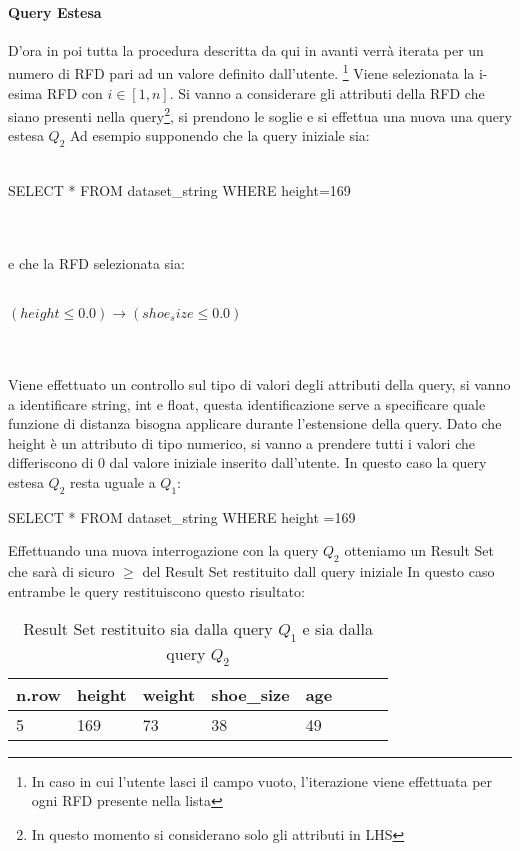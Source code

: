 \paragraph{Query Estesa}
D'ora in poi tutta la procedura descritta da qui in avanti verrà iterata per un numero di RFD pari ad un valore definito dall'utente. \footnote{In caso in cui l'utente lasci il campo vuoto, l'iterazione viene effettuata per ogni RFD presente nella lista}
Viene selezionata la i-esima RFD con $i\in[1,n]$. 
Si vanno a considerare gli attributi della RFD che siano presenti nella query\footnote{In questo momento si considerano solo gli attributi in LHS}, si prendono le soglie e si effettua una nuova una query estesa $Q_2$
Ad esempio supponendo che la query iniziale sia: \\~\\ \centerline{SELECT * FROM dataset{\_}string WHERE height=169} \\~\\ e che la RFD selezionata sia: \\~\\ \centerline{$(height \leq 0.0)  \rightarrow(shoe_size \leq 0.0)$} \\~\\
Viene effettuato un controllo sul tipo di valori degli attributi della query,
si vanno a identificare string, int e float, questa identificazione serve a specificare quale funzione di distanza bisogna applicare durante l'estensione della query.
Dato che height è un attributo di tipo numerico, si vanno a prendere tutti i valori che differiscono di 0 dal valore iniziale inserito dall'utente. In questo caso la query estesa $Q_2$ resta uguale a $Q_1$: \newline 
\centerline{SELECT * FROM dataset{\_}string WHERE height =169} \newline
Effettuando una nuova interrogazione con la query $Q_2$ otteniamo un Result Set che sarà di sicuro $\geq$ del Result Set restituito dall query iniziale
In questo caso entrambe le query restituiscono questo risultato: \newline 
\begin{table}[H]
    \centering
    \begin{tabular}{l l l l l l l l}
    n.row   & height & weight & shoe{\_}size & age \\
    \hline
    5 & 169 & 73 & 38 & 49 \\

    \end{tabular}
    \caption{Result Set restituito sia dalla query $Q_1$ e sia dalla query $Q_2$ }
    \label{tab:sta_ext_result_set}
\end{table}
